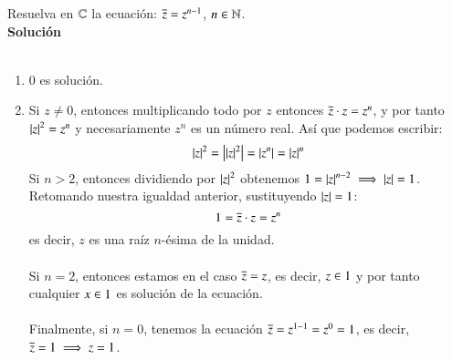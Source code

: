     \begin{ex}[H2.15]\label{eg:2.15}
        Resuelva en $\mathbb{C}$ la ecuación: $\overline{z} = z^{n-1}$, $n\in \mathbb{N}$.\\

        \textbf{Solución}\\\\
        \begin{enumerate}[1)]
            \item $0$ es solución.
            \item Si $z \neq 0$, entonces multiplicando todo por $z$ entonces $\overline{z} \cdot z = z^n$, y por tanto $\left|z\right|^2 = z^n$ y necesariamente $z^n$ es un número real. Así que podemos escribir:
            $$
                \left|z\right|^2 = \left| \left|z\right|^2 \right| = \left|z^n\right| = \left|z\right|^n
            $$
            Si $n > 2$, entonces dividiendo por $\left|z\right|^2$ obtenemos $1 = \left|z\right|^{n-2} \implies \left|z\right| = 1$. Retomando nuestra igualdad anterior, sustituyendo $\left|z\right|=1$:
            $$
                1 = \overline{z} \cdot z = z^n
            $$
            es decir, $z$ es una raíz $n$-ésima de la unidad.\\\\
            Si $n=2$, entonces estamos en el caso $\overline{z} = z$, es decir, $z \in 1$ y por tanto cualquier $x \in 1$ es solución de la ecuación.\\\\
            Finalmente, si $n = 0$, tenemos la ecuación $\overline{z} = z^{1-1} = z^0 = 1$, es decir, $\overline{z} = 1 \implies z = 1$.
        \end{enumerate}
    \end{ex}
